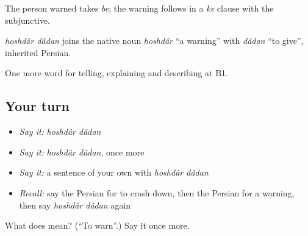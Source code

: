 The person warned takes \emph{be}; the warning follows in a \emph{ke} clause with the subjunctive.

\begin{cousinweb}
\emph{hoshdâr dâdan} joins the native noun \emph{hoshdâr} \textquotedblleft{}a warning\textquotedblright{} with \emph{dâdan} \textquotedblleft{}to give\textquotedblright{}, inherited Persian.
\end{cousinweb}

\begin{grammarlens}[title={What you've built}]
One more word for telling, explaining and describing at B1.
\end{grammarlens}

\subsection*{Your turn}
\begin{itemize}
\raggedright
  \item \emph{Say it:} \emph{hoshdâr dâdan}
  \item \emph{Say it:} \emph{hoshdâr dâdan}, once more
  \item \emph{Say it:} a sentence of your own with \emph{hoshdâr dâdan}
  \item \emph{Recall:} say the Persian for to crash down, then the Persian for a warning, then say \emph{hoshdâr dâdan} again
\end{itemize}

\begin{tcolorbox}[breakable,colback=teal!4,colframe=teal!35!black,title={Before you move on}]
What does   mean? (\textquotedblleft{}To warn\textquotedblright{}.) Say it once more.
\end{tcolorbox}

